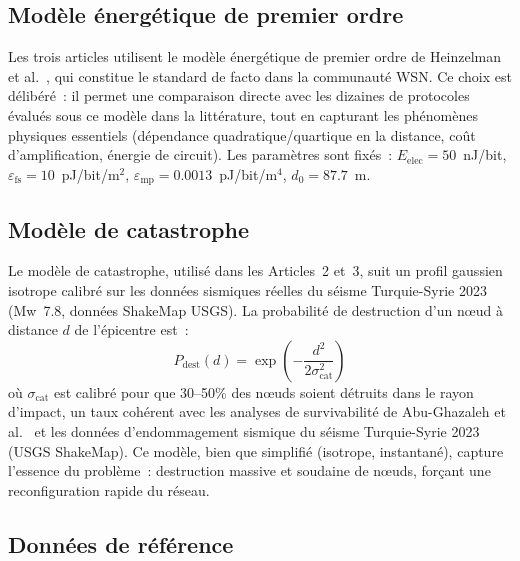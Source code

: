 \subsection{Modèle énergétique de premier ordre}

Les trois articles utilisent le modèle énergétique de premier ordre de Heinzelman et al.\ \cite{heinzelman2000leach}, qui constitue le standard de facto dans la communauté WSN. Ce choix est délibéré~: il permet une comparaison directe avec les dizaines de protocoles évalués sous ce modèle dans la littérature, tout en capturant les phénomènes physiques essentiels (dépendance quadratique/quartique en la distance, coût d'amplification, énergie de circuit). Les paramètres sont fixés~: $E_{\text{elec}} = 50$~nJ/bit, $\varepsilon_{\text{fs}} = 10$~pJ/bit/m$^2$, $\varepsilon_{\text{mp}} = 0.0013$~pJ/bit/m$^4$, $d_0 = 87.7$~m.

\subsection{Modèle de catastrophe}

Le modèle de catastrophe, utilisé dans les Articles~2 et~3, suit un profil gaussien isotrope calibré sur les données sismiques réelles du séisme Turquie-Syrie 2023 (Mw~7.8, données ShakeMap USGS). La probabilité de destruction d'un n\oe{}ud à distance $d$ de l'épicentre est~:
\begin{equation}\label{eq:disaster-model}
    P_{\text{dest}}(d) = \exp\!\left(-\frac{d^2}{2\sigma_{\text{cat}}^2}\right)
\end{equation}
où $\sigma_{\text{cat}}$ est calibré pour que 30--50\% des n\oe{}uds soient détruits dans le rayon d'impact, un taux cohérent avec les analyses de survivabilité de Abu-Ghazaleh et al.\ \cite{AbuGhazaleh2007WSNSurvivability} et les données d'endommagement sismique du séisme Turquie-Syrie 2023 (USGS ShakeMap). Ce modèle, bien que simplifié (isotrope, instantané), capture l'essence du problème~: destruction massive et soudaine de n\oe{}uds, forçant une reconfiguration rapide du réseau.

\subsection{Données de référence}

